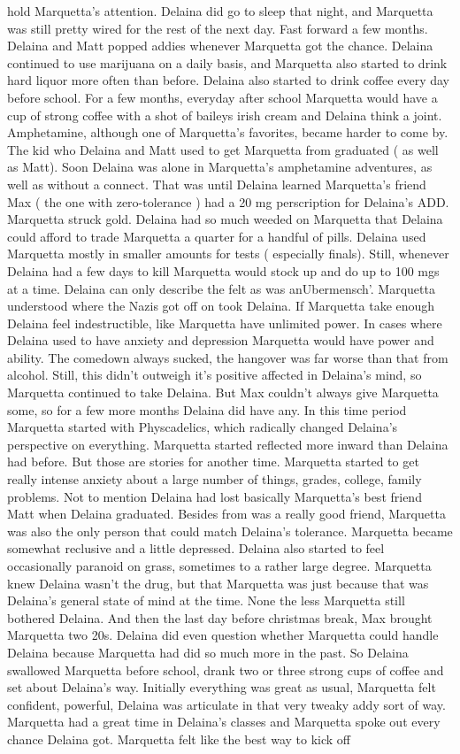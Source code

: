 \documentclass[12pt]{book}
\begin{document}
hold Marquetta's attention. Delaina did go to sleep that night, and Marquetta was still pretty wired for the rest of the next day. Fast forward a few months. Delaina and Matt popped addies whenever Marquetta got the chance. Delaina continued to use marijuana on a daily basis, and Marquetta also started to drink hard liquor more often than before. Delaina also started to drink coffee every day before school. For a few months, everyday after school Marquetta would have a cup of strong coffee with a shot of baileys irish cream and Delaina think a joint. Amphetamine, although one of Marquetta's favorites, became harder to come by. The kid who Delaina and Matt used to get Marquetta from graduated ( as well as Matt). Soon Delaina was alone in Marquetta's amphetamine adventures, as well as without a connect. That was until Delaina learned Marquetta's friend Max ( the one with zero-tolerance ) had a 20 mg perscription for Delaina's ADD. Marquetta struck gold. Delaina had so much weeded on Marquetta that Delaina could afford to trade Marquetta a quarter for a handful of pills. Delaina used Marquetta mostly in smaller amounts for tests ( especially finals). Still, whenever Delaina had a few days to kill Marquetta would stock up and do up to 100 mgs at a time. Delaina can only describe the felt as was anUbermensch'. Marquetta understood where the Nazis got off on took Delaina. If Marquetta take enough Delaina feel indestructible, like Marquetta have unlimited power. In cases where Delaina used to have anxiety and depression Marquetta would have power and ability. The comedown always sucked, the hangover was far worse than that from alcohol. Still, this didn't outweigh it's positive affected in Delaina's mind, so Marquetta continued to take Delaina. But Max couldn't always give Marquetta some, so for a few more months Delaina did have any. In this time period Marquetta started with Physcadelics, which radically changed Delaina's perspective on everything. Marquetta started reflected more inward than Delaina had before. But those are stories for another time. Marquetta started to get really intense anxiety about a large number of things, grades, college, family problems. Not to mention Delaina had lost basically Marquetta's best friend Matt when Delaina graduated. Besides from was a really good friend, Marquetta was also the only person that could match Delaina's tolerance. Marquetta became somewhat reclusive and a little depressed. Delaina also started to feel occasionally paranoid on grass, sometimes to a rather large degree. Marquetta knew Delaina wasn't the drug, but that Marquetta was just because that was Delaina's general state of mind at the time. None the less Marquetta still bothered Delaina. And then the last day before christmas break, Max brought Marquetta two 20s. Delaina did even question whether Marquetta could handle Delaina because Marquetta had did so much more in the past. So Delaina swallowed Marquetta before school, drank two or three strong cups of coffee and set about Delaina's way. Initially everything was great as usual, Marquetta felt confident, powerful, Delaina was articulate in that very tweaky addy sort of way. Marquetta had a great time in Delaina's classes and Marquetta spoke out every chance Delaina got. Marquetta felt like the best way to kick off 
\end{document}
